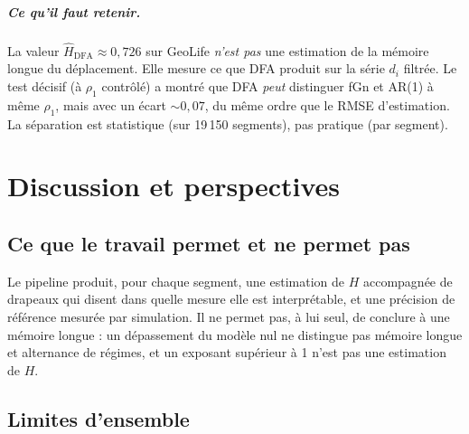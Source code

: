 \documentclass[12pt,a4paper]{report}
\theoremstyle{definition}
\begin{document}
\paragraph{Ce qu'il faut retenir.} La valeur $\hat H_{\mathrm{DFA}} \approx 0{,}726$ sur
GeoLife \emph{n'est pas} une estimation de la mémoire longue du déplacement. Elle mesure
ce que DFA produit sur la série $d_i$ filtrée. Le test décisif (à $\rho_1$ contrôlé) a
montré que DFA \emph{peut} distinguer fGn et AR(1) à même $\rho_1$, mais avec un écart
$\sim 0{,}07$, du même ordre que le RMSE d'estimation. La séparation est statistique (sur
19\,150 segments), pas pratique (par segment).

\chapter{Discussion et perspectives}
\label{ch:discussion}

\section{Ce que le travail permet et ne permet pas}

Le pipeline produit, pour chaque segment, une estimation de $H$ accompagnée de drapeaux
qui disent dans quelle mesure elle est interprétable, et une précision de référence mesurée
par simulation. Il ne permet pas, à lui seul, de conclure à une mémoire longue : un
dépassement du modèle nul ne distingue pas mémoire longue et alternance de régimes, et un
exposant supérieur à 1 n'est pas une estimation de $H$.

\section{Limites d'ensemble}
\end{document}
